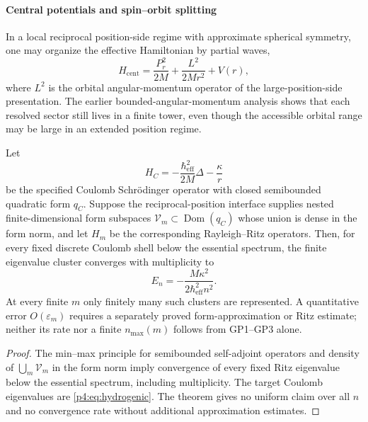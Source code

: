 \documentclass[12pt,a4paper]{article}
\begin{document}
\paragraph[Central potentials, hydrogenic sectors, and spin--orbit splitting]
{Central potentials and spin--orbit splitting}
\label{p4:sec:part2-central}

In a local reciprocal position-side regime with approximate spherical symmetry, one may organize the effective Hamiltonian by partial waves,
\begin{equation}
\label{p4:eq:central-H}
H_{\mathrm{cent}}=\frac{P_r^2}{2M}+\frac{L^2}{2Mr^2}+V(r),
\end{equation}
where $L^2$ is the orbital angular-momentum operator of the large-position-side presentation.
The earlier bounded-angular-momentum analysis shows that each resolved sector still lives in a finite tower, even though the accessible orbital range may be large in an extended position regime.
\begin{proposition}
\label{p4:prop:conditional-hydrogenic-spectrum}
Let
\[
H_C=-\frac{\hbar_{\mathrm{eff}}^2}{2M}\Delta-\frac{\kappa}{r}
\]
be the specified Coulomb Schr\"odinger operator with closed semibounded
quadratic form \(q_C\).  Suppose the reciprocal-position interface supplies
nested finite-dimensional form subspaces
\(\mathcal V_m\subset\operatorname{Dom}(q_C)\) whose union is dense in the
form norm, and let \(H_m\) be the corresponding Rayleigh--Ritz operators.
Then, for every fixed discrete Coulomb shell below the essential spectrum, the
finite eigenvalue cluster converges with multiplicity to
\begin{equation}
\label{p4:eq:hydrogenic}
E_n=-\frac{M\kappa^2}{2\hbar_{\mathrm{eff}}^2 n^2}.
\end{equation}
At every finite \(m\) only finitely many such clusters are represented.  A
quantitative error \(O(\varepsilon_m)\) requires a separately proved
form-approximation or Ritz estimate; neither its rate nor a finite
\(n_{\max}(m)\) follows from GP1--GP3 alone.
\end{proposition}

\begin{proof}
The min--max principle for semibounded self-adjoint operators and density of
\(\bigcup_m\mathcal V_m\) in the form norm imply convergence of every fixed
Ritz eigenvalue below the essential spectrum, including multiplicity.  The
target Coulomb eigenvalues are \eqref{p4:eq:hydrogenic}.  The theorem gives no
uniform claim over all \(n\) and no convergence rate without additional
approximation estimates.
\end{proof}
\end{document}
